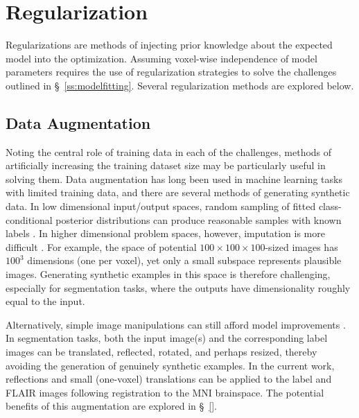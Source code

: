 \section{Regularization}\label{s:method-reg}
Regularizations are methods of injecting prior knowledge about the expected model into the optimization.
Assuming voxel-wise independence of model parameters requires the use of regularization strategies to solve the challenges outlined in \S\ \ref{ss:modelfitting}.
Several regularization methods are explored below.
\subsection{Data Augmentation}\label{ss:meth-aug}
Noting the central role of training data in each of the challenges, methods of artificially increasing the training dataset size may be particularly useful in solving them.
Data augmentation has long been used in machine learning tasks with limited training data, and there are several methods of generating synthetic data.
In low dimensional input/output spaces, random sampling of fitted class-conditional posterior distributions can produce reasonable samples with known labels \cite{Tanner1987}.
In higher dimensional problem spaces, however, imputation is more difficult \cite{Goodfellow2014}.
For example, the space of potential $100\times100\times100$-sized images has $100^3$ dimensions (one per voxel), yet only a small subspace represents plausible images.
Generating synthetic examples in this space is therefore challenging, especially for segmentation tasks, where the outputs have dimensionality roughly equal to the input.
\par
Alternatively, simple image manipulations can still afford model improvements \cite{Krizhevsky2012}.
In segmentation tasks, both the input image(s) and the corresponding label images can be translated, reflected, rotated, and perhaps resized, thereby avoiding the generation of genuinely synthetic examples.
In the current work, reflections and small (one-voxel) translations can be applied to the label and FLAIR images following registration to the MNI brainspace.
The potential benefits of this augmentation are explored in \S\ \ref{}.
